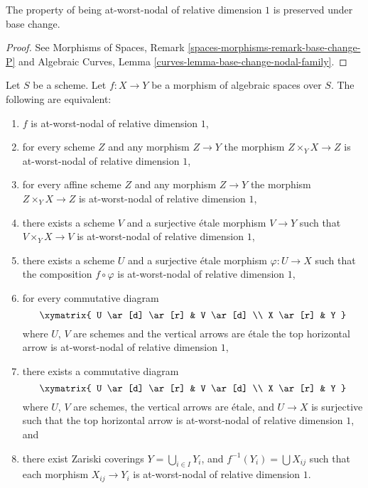 \begin{lemma}
\label{lemma-base-change-nodal}
The property of being at-worst-nodal of relative dimension $1$
is preserved under base change.
\end{lemma}

\begin{proof}
See
Morphisms of Spaces, Remark \ref{spaces-morphisms-remark-base-change-P}
and
Algebraic Curves, Lemma \ref{curves-lemma-base-change-nodal-family}.
\end{proof}

\begin{lemma}
\label{lemma-nodal-local}
Let $S$ be a scheme.
Let $f : X \to Y$ be a morphism of algebraic spaces over $S$.
The following are equivalent:
\begin{enumerate}
\item $f$ is at-worst-nodal of relative dimension $1$,
\item for every scheme $Z$ and any morphism $Z \to Y$ the morphism
$Z \times_Y X \to Z$ is at-worst-nodal of relative dimension $1$,
\item for every affine scheme $Z$ and any morphism
$Z \to Y$ the morphism $Z \times_Y X \to Z$ is
at-worst-nodal of relative dimension $1$,
\item there exists a scheme $V$ and a surjective \'etale morphism
$V \to Y$ such that $V \times_Y X \to V$ is
at-worst-nodal of relative dimension $1$,
\item there exists a scheme $U$ and a surjective \'etale morphism
$\varphi : U \to X$ such that the composition $f \circ \varphi$
is at-worst-nodal of relative dimension $1$,
\item for every commutative diagram
$$
\xymatrix{
U \ar[d] \ar[r] & V \ar[d] \\
X \ar[r] & Y
}
$$
where $U$, $V$ are schemes and the vertical arrows are \'etale
the top horizontal arrow is at-worst-nodal of relative dimension $1$,
\item there exists a commutative diagram
$$
\xymatrix{
U \ar[d] \ar[r] & V \ar[d] \\
X \ar[r] & Y
}
$$
where $U$, $V$ are schemes, the vertical arrows are \'etale, and
$U \to X$ is surjective such that the top horizontal arrow is
at-worst-nodal of relative dimension $1$, and
\item there exist Zariski coverings $Y = \bigcup_{i \in I} Y_i$,
and $f^{-1}(Y_i) = \bigcup X_{ij}$ such that
each morphism $X_{ij} \to Y_i$ is
at-worst-nodal of relative dimension $1$.
\end{enumerate}
\end{lemma}

